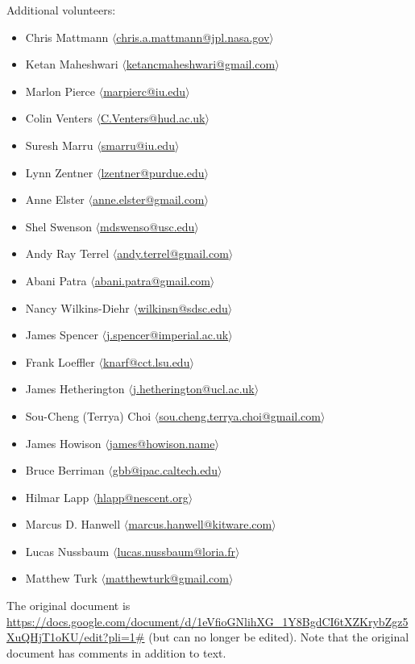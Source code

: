 \documentclass[11pt, oneside]{amsart}
\begin{document}
Additional volunteers:
\begin{itemize}
\item Chris Mattmann $\langle$\url{chris.a.mattmann@jpl.nasa.gov}$\rangle$
\item Ketan Maheshwari $\langle$\url{ketancmaheshwari@gmail.com}$\rangle$
\item Marlon Pierce $\langle$\url{marpierc@iu.edu}$\rangle$
\item Colin Venters $\langle$\url{C.Venters@hud.ac.uk}$\rangle$
\item Suresh Marru $\langle$\url{smarru@iu.edu}$\rangle$
\item Lynn Zentner $\langle$\url{lzentner@purdue.edu}$\rangle$
\item Anne Elster $\langle$\url{anne.elster@gmail.com}$\rangle$
\item Shel Swenson $\langle$\url{mdswenso@usc.edu}$\rangle$
\item Andy Ray Terrel $\langle$\url{andy.terrel@gmail.com}$\rangle$
\item Abani Patra $\langle$\url{abani.patra@gmail.com}$\rangle$
\item Nancy Wilkins-Diehr $\langle$\url{wilkinsn@sdsc.edu}$\rangle$
\item James Spencer $\langle$\url{j.spencer@imperial.ac.uk}$\rangle$
\item Frank Loeffler $\langle$\url{knarf@cct.lsu.edu}$\rangle$
\item James Hetherington $\langle$\url{j.hetherington@ucl.ac.uk}$\rangle$
\item Sou-Cheng (Terrya) Choi $\langle$\url{sou.cheng.terrya.choi@gmail.com}$\rangle$
\item James Howison $\langle$\url{james@howison.name}$\rangle$
\item Bruce Berriman $\langle$\url{gbb@ipac.caltech.edu}$\rangle$
\item Hilmar Lapp $\langle$\url{hlapp@nescent.org}$\rangle$
\item Marcus D. Hanwell $\langle$\url{marcus.hanwell@kitware.com}$\rangle$
\item Lucas Nussbaum $\langle$\url{lucas.nussbaum@loria.fr}$\rangle$
\item Matthew Turk $\langle$\url{matthewturk@gmail.com}$\rangle$
\end{itemize}

The original document is \url{https://docs.google.com/document/d/1eVfioGNlihXG_1Y8BgdCI6tXZKrybZgz5XuQHjT1oKU/edit?pli=1#} (but can no longer be edited).
Note that the original document has comments in addition to text.
\end{document}
